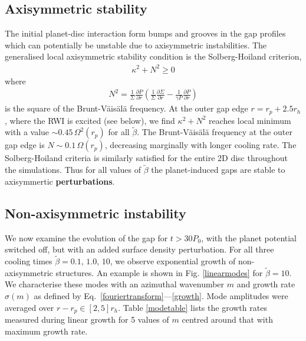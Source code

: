 \subsection{Axisymmetric stability}
The initial planet-disc interaction form bumps and grooves in the gap profiles
which can potentially be unstable due to axisymmetric instabilities. The
generalised local axisymmetric stability condition is the Solberg-Hoiland
criterion,  
\begin{align}
  \kappa^2+N^2 \geq 0 
\end{align}
where
\begin{align}
 N^2=\frac{1}{\Sigma} \frac{\partial P}{\partial r}
 \left(\frac{1}{\Sigma} \frac{\partial \Sigma}{\partial
     r}-\frac{1}{\gamma P} \frac{\partial P}{\partial r}  \right) 
\end{align}
is the square of the Brunt-V\"ais\"al\"a frequency. 
At the outer gap edge $r=r_p+2.5r_h$,  where the RWI is excited
(see below),  we find $\kappa^2 + N^2$ reaches local minimum with a value
$\sim 0.45 \, \Omega^2(r_p)$
 for all $\tilde\beta$. The
Brunt-V\"ais\"al\"a frequency at the outer gap edge is
$N\sim 0.1 \, \Omega(r_p)$,  
decreasing marginally with longer cooling rate. 
The Solberg-Hoiland criteria is similarly satisfied for the entire 2D disc throughout the 
simulations.
Thus for all values of $\tilde\beta$ the planet-induced gaps are
stable to axisymmertic {\bf perturbations}. 

\subsection{Non-axisymmetric instability}\label{linear}
We now examine the evolution of the gap for $t>30P_0$, with the
planet potential switched off, but with an added surface density
perturbation. For all three cooling times $\tilde{\beta}=0.1,\, 1.0,\,
10$, we observe exponential growth of non-axisymmetric
structures. An example is shown in Fig. \ref{linearmodes} for 
$\tilde{\beta}=10$. We characterise these
modes with an azimuthal wavenumber $m$ and growth rate $\sigma(m)$ as defined by
Eq.~\ref{fouriertransform}---\ref{growth}. Mode amplitudes were
averaged over $r-r_p\in[2,5]r_h$. Table \ref{modetable}
lists the growth rates measured during 
linear growth for 5 values of $m$ centred around that with maximum
growth rate. 

